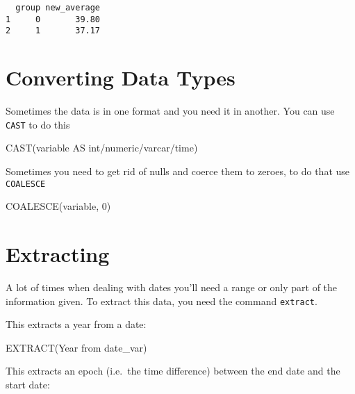 \documentclass[
  letterpaper,
  DIV=11,
  numbers=noendperiod]{scrreprt}
\newenvironment{Shaded}{\begin{snugshade}}{\end{snugshade}}
\newcommand{\DataTypeTok}[1]{\textcolor[rgb]{0.68,0.00,0.00}{#1}}
\newcommand{\DecValTok}[1]{\textcolor[rgb]{0.68,0.00,0.00}{#1}}
\newcommand{\FunctionTok}[1]{\textcolor[rgb]{0.28,0.35,0.67}{#1}}
\newcommand{\KeywordTok}[1]{\textcolor[rgb]{0.00,0.23,0.31}{#1}}
\newcommand{\NormalTok}[1]{\textcolor[rgb]{0.00,0.23,0.31}{#1}}
\newcommand{\OperatorTok}[1]{\textcolor[rgb]{0.37,0.37,0.37}{#1}}
\begin{document}
\begin{verbatim}
  group new_average
1     0       39.80
2     1       37.17
\end{verbatim}

\hypertarget{converting-data-types}{%
\section{Converting Data Types}\label{converting-data-types}}

Sometimes the data is in one format and you need it in another. You can
use \texttt{CAST} to do this

\begin{Shaded}
\begin{Highlighting}[]
\FunctionTok{CAST}\NormalTok{(variable }\KeywordTok{AS} \DataTypeTok{int}\OperatorTok{/}\DataTypeTok{numeric}\OperatorTok{/}\NormalTok{varcar}\OperatorTok{/}\DataTypeTok{time}\NormalTok{)}
\end{Highlighting}
\end{Shaded}

Sometimes you need to get rid of nulls and coerce them to zeroes, to do
that use \texttt{COALESCE}

\begin{Shaded}
\begin{Highlighting}[]
\FunctionTok{COALESCE}\NormalTok{(variable, }\DecValTok{0}\NormalTok{)}
\end{Highlighting}
\end{Shaded}

\hypertarget{extracting}{%
\section{Extracting}\label{extracting}}

A lot of times when dealing with dates you'll need a range or only part
of the information given. To extract this data, you need the command
\texttt{extract}.

This extracts a year from a date:

\begin{Shaded}
\begin{Highlighting}[]
\FunctionTok{EXTRACT}\NormalTok{(}\DataTypeTok{Year} \KeywordTok{from}\NormalTok{ date\_var)}
\end{Highlighting}
\end{Shaded}

This extracts an epoch (i.e.~the time difference) between the end date
and the start date:
\end{document}
